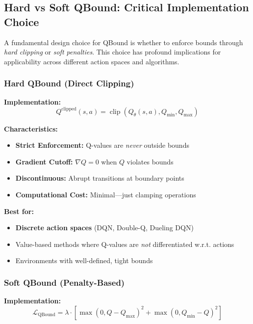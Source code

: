 \documentclass[11pt]{article}
\theoremstyle{definition}
\theoremstyle{remark}
\DeclareMathOperator{\clip}{clip}
\begin{document}
\subsection{Hard vs Soft QBound: Critical Implementation Choice}

\label{sec:hard_vs_soft}

A fundamental design choice for QBound is whether to enforce bounds through \textit{hard clipping} or \textit{soft penalties}. This choice has profound implications for applicability across different action spaces and algorithms.

\subsubsection{Hard QBound (Direct Clipping)}

\textbf{Implementation:}
\begin{equation}
Q^{\text{clipped}}(s,a) = \clip(Q_\theta(s,a), Q_{\min}, Q_{\max})
\end{equation}

\textbf{Characteristics:}
\begin{itemize}
    \item \textbf{Strict Enforcement:} Q-values are \textit{never} outside bounds
    \item \textbf{Gradient Cutoff:} $\nabla Q = 0$ when $Q$ violates bounds
    \item \textbf{Discontinuous:} Abrupt transitions at boundary points
    \item \textbf{Computational Cost:} Minimal—just clamping operations
\end{itemize}

\textbf{Best for:}
\begin{itemize}
    \item \textbf{Discrete action spaces} (DQN, Double-Q, Dueling DQN)
    \item Value-based methods where Q-values are \textit{not} differentiated w.r.t. actions
    \item Environments with well-defined, tight bounds
\end{itemize}

\subsubsection{Soft QBound (Penalty-Based)}

\textbf{Implementation:}
\begin{equation}
\mathcal{L}_{\text{QBound}} = \lambda \cdot \left[ \max(0, Q - Q_{\max})^2 + \max(0, Q_{\min} - Q)^2 \right]
\end{equation}
\end{document}
